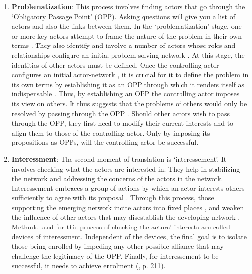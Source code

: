 \begin{enumerate}
  \item \textbf{Problematization}: This process involves finding actors that go through the ‘Obligatory Passage Point' (OPP). Asking questions will give you a list of actors and also the links between them. In the ‘problematization’ stage, one or more key actors attempt to frame the nature of the problem in their own terms \cite{tatnall2002using, sarker2006understanding}. They also identify and involve a number of actors whose roles and relationships configure an initial problem-solving network \cite{linde2003actor}. At this stage, the identities of other actors must be defined. Once the controlling actor configures an initial actor-network \cite{linde2003actor}, it is crucial for it to define the problem in its own terms by establishing it as an OPP through which it renders itself as indispensable \cite{callon1986sociology}. Thus, by establishing an OPP the controlling actor imposes its view on others. It thus suggests that the problems of others would only be resolved by passing through the OPP \cite{law1986heterogeneity}. Should other actors wish to pass through the OPP, they first need to modify their current interests and to align them to those of the controlling actor. Only by imposing its propositions as OPPs, will the controlling actor be successful.
  \item \textbf{Interessment}: The second moment of translation is ‘interessement’. It involves checking what the actors are interested in. They help in stabilizing the network and addressing the concerns of the actors in the network. Interessement embraces a group of actions by which an actor interests others sufficiently to agree with its proposal \cite{callon1986sociology}. Through this process, those supporting the emerging network incite actors into fixed places \cite{tatnall2002using}, and weaken the influence of other actors that may disestablish the developing network \cite{linde2003actor}. Methods used for this process of checking the actors' interests are called devices of interessment. Independent of the devices, the final goal is to isolate those being enrolled by impeding any other possible alliance that may challenge the legitimacy of the OPP. Finally, for interessement to be successful, it needs to achieve enrolment (\cite{callon1986sociology}, p. 211).
  

\end{enumerate}
